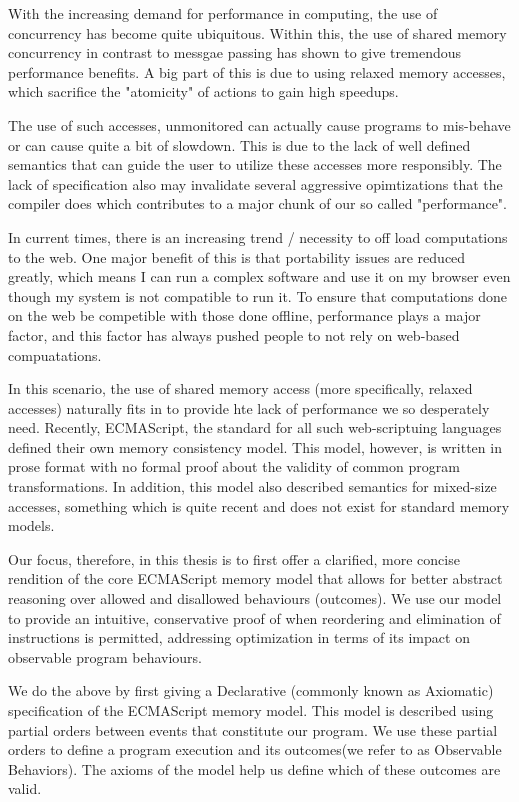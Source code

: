      
With the increasing demand for performance in computing, the use of concurrency has become quite ubiquitous. 
Within this, the use of shared memory concurrency in contrast to messgae passing has shown to give tremendous performance benefits. 
A big part of this is due to using relaxed memory accesses, which sacrifice the "atomicity" of actions to gain high speedups. 

The use of such accesses, unmonitored can actually cause programs to mis-behave or can cause quite a bit of slowdown. 
This is due to the lack of well defined semantics that can guide the user to utilize these accesses more responsibly.
The lack of specification also may invalidate several aggressive opimtizations that the compiler does which contributes to a major chunk of our so called "performance".

In current times, there is an increasing trend / necessity to off load computations to the web. 
One major benefit of this is that portability issues are reduced greatly, which means I can run a complex software and use it on my browser even though my system is not compatible to run it. 
To ensure that computations done on the web be competible with those done offline, performance plays a major factor, and this factor has always pushed people to not rely on web-based compuatations. 

In this scenario, the use of shared memory access (more specifically, relaxed accesses) naturally fits in to provide hte lack of performance we so desperately need.
Recently, ECMAScript, the standard for all such web-scriptuing languages defined their own memory consistency model.
This model, however, is written in prose format with no formal proof about the validity of common program transformations.
In addition, this model also described semantics for mixed-size accesses, something which is quite recent and does not exist for standard memory models. 

Our focus, therefore, in this thesis is to first offer a clarified, more concise rendition of the core ECMAScript memory model that allows for better abstract reasoning over allowed and disallowed behaviours (outcomes). 
We use our model to provide an intuitive, conservative proof of when reordering and elimination of instructions is permitted, addressing optimization in terms of its impact on observable program behaviours. 

We do the above by first giving a Declarative (commonly known as Axiomatic) specification of the ECMAScript memory model. 
This model is described using partial orders between events that constitute our program.
We use these partial orders to define a program execution and its outcomes(we refer to as Observable Behaviors).
The axioms of the model help us define which of these outcomes are valid.


